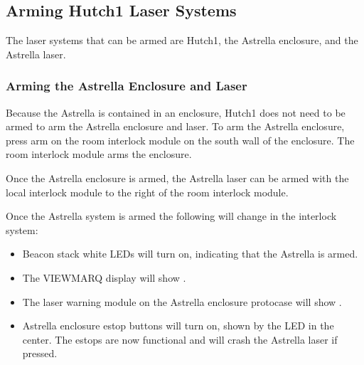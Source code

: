 \documentclass[letterpaper,10pt,english]{sphinxmanual}
\begin{document}
\subsection{Arming Hutch\sphinxhyphen{}1 Laser Systems}
\label{\detokenize{user_documentation/Hutch-1_laser:arming-hutch-1-laser-systems}}
\sphinxAtStartPar
The laser systems that can be armed are Hutch\sphinxhyphen{}1, the Astrella enclosure, and the Astrella laser.


\subsubsection{Arming the Astrella Enclosure and Laser}
\label{\detokenize{user_documentation/Hutch-1_laser:arming-the-astrella-enclosure-and-laser}}
\sphinxAtStartPar
Because the Astrella is contained in an enclosure, Hutch\sphinxhyphen{}1 does not need to be armed to arm the Astrella enclosure and laser.
To arm the Astrella enclosure, press arm on the room interlock module on the south wall of the enclosure.
The room interlock module arms the enclosure.

\sphinxAtStartPar
Once the Astrella enclosure is armed, the Astrella laser can be armed with the local interlock module to the right of the room interlock module.

\sphinxAtStartPar
Once the Astrella system is armed the following will change in the interlock system:
\begin{itemize}
\item {} 
\sphinxAtStartPar
Beacon stack white LEDs will turn on, indicating that the Astrella is armed.

\item {} 
\sphinxAtStartPar
The VIEWMARQ display will show .

\item {} 
\sphinxAtStartPar
The laser warning module on the Astrella enclosure protocase will show .

\item {} 
\sphinxAtStartPar
Astrella enclosure e\sphinxhyphen{}stop buttons will turn on, shown by the LED in the center.
The e\sphinxhyphen{}stops are now functional and will crash the Astrella laser if pressed.

\end{itemize}
\end{document}
